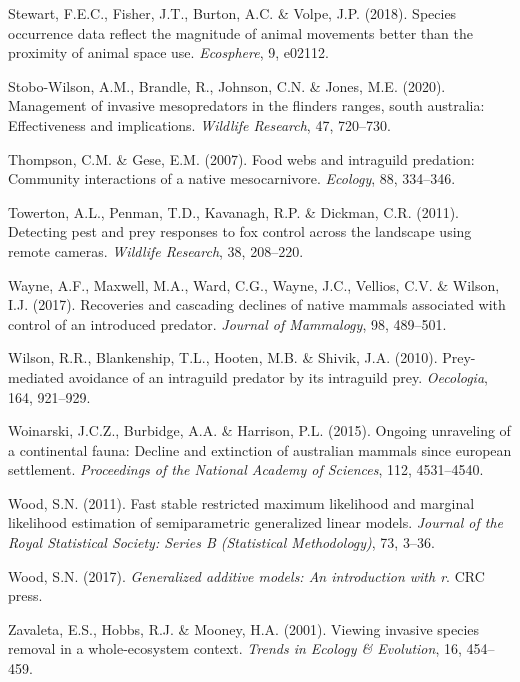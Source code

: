 \documentclass[]{elsarticle} %
\begin{document}
\leavevmode\hypertarget{ref-stewart2018}{}%
Stewart, F.E.C., Fisher, J.T., Burton, A.C. \& Volpe, J.P. (2018). Species occurrence data reflect the magnitude of animal movements better than the proximity of animal space use. \emph{Ecosphere}, 9, e02112.

\leavevmode\hypertarget{ref-stobo2020management}{}%
Stobo-Wilson, A.M., Brandle, R., Johnson, C.N. \& Jones, M.E. (2020). Management of invasive mesopredators in the flinders ranges, south australia: Effectiveness and implications. \emph{Wildlife Research}, 47, 720--730.

\leavevmode\hypertarget{ref-thompson2007food}{}%
Thompson, C.M. \& Gese, E.M. (2007). Food webs and intraguild predation: Community interactions of a native mesocarnivore. \emph{Ecology}, 88, 334--346.

\leavevmode\hypertarget{ref-towerton2011}{}%
Towerton, A.L., Penman, T.D., Kavanagh, R.P. \& Dickman, C.R. (2011). Detecting pest and prey responses to fox control across the landscape using remote cameras. \emph{Wildlife Research}, 38, 208--220.

\leavevmode\hypertarget{ref-wayne2017recoveries}{}%
Wayne, A.F., Maxwell, M.A., Ward, C.G., Wayne, J.C., Vellios, C.V. \& Wilson, I.J. (2017). Recoveries and cascading declines of native mammals associated with control of an introduced predator. \emph{Journal of Mammalogy}, 98, 489--501.

\leavevmode\hypertarget{ref-wilson2010prey}{}%
Wilson, R.R., Blankenship, T.L., Hooten, M.B. \& Shivik, J.A. (2010). Prey-mediated avoidance of an intraguild predator by its intraguild prey. \emph{Oecologia}, 164, 921--929.

\leavevmode\hypertarget{ref-Woinarski4531}{}%
Woinarski, J.C.Z., Burbidge, A.A. \& Harrison, P.L. (2015). Ongoing unraveling of a continental fauna: Decline and extinction of australian mammals since european settlement. \emph{Proceedings of the National Academy of Sciences}, 112, 4531--4540.

\leavevmode\hypertarget{ref-wood2011}{}%
Wood, S.N. (2011). Fast stable restricted maximum likelihood and marginal likelihood estimation of semiparametric generalized linear models. \emph{Journal of the Royal Statistical Society: Series B (Statistical Methodology)}, 73, 3--36.

\leavevmode\hypertarget{ref-wood2017}{}%
Wood, S.N. (2017). \emph{Generalized additive models: An introduction with r}. CRC press.

\leavevmode\hypertarget{ref-zavaleta2001}{}%
Zavaleta, E.S., Hobbs, R.J. \& Mooney, H.A. (2001). Viewing invasive species removal in a whole-ecosystem context. \emph{Trends in Ecology \& Evolution}, 16, 454--459.
\end{document}
